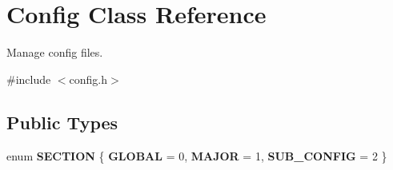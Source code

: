 \hypertarget{class_config}{}\section{Config Class Reference}
\label{class_config}


Manage config files.  




{\ttfamily \#include $<$config.\+h$>$}

\subsection*{Public Types}
\begin{DoxyCompactItemize}
\item 
\mbox{\label{class_config_aecaa9226d0d87955e3813b7e12da5bd3}} 
enum {\bfseries S\+E\+C\+T\+I\+ON} \{ {\bfseries G\+L\+O\+B\+AL} = 0, 
{\bfseries M\+A\+J\+OR} = 1, 
{\bfseries S\+U\+B\+\_\+\+C\+O\+N\+F\+IG} = 2
 \}
\end{DoxyCompactItemize}
